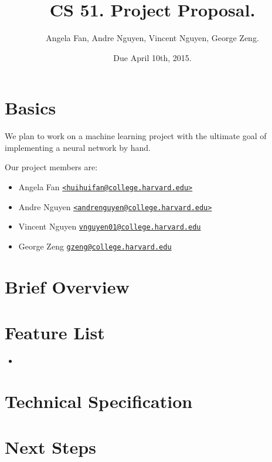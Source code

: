 \documentclass[12pt]{article}
\begin{document}
\title{CS 51. Project Proposal.}
\date{Due April 10th, 2015.}
\author{Angela Fan, Andre Nguyen, Vincent Nguyen, George Zeng.}
\maketitle

\section{Basics}
We plan to work on a machine learning project with the ultimate goal of implementing a neural network by hand.

Our project members are:
\begin{itemize}
  \item Angela Fan \href{mailto:huihuifan@college.harvard.edu}
    {\nolinkurl{<huihuifan@college.harvard.edu>}}
  \item Andre Nguyen \href{mailto:andrenguyen@college.harvard.edu}
    {\nolinkurl{<andrenguyen@college.harvard.edu>}}
  \item Vincent Nguyen \href{mailto:vnguyen01@college.harvard.edu}
    {\nolinkurl{vnguyen01@college.harvard.edu}}
  \item George Zeng \href{mailto:gzeng@college.harvard.edu}
    {\nolinkurl{gzeng@college.harvard.edu}}
\end{itemize}

\section{Brief Overview}

\section{Feature List}
\begin{itemize}
  \item 
\end{itemize}

\section{Technical Specification}

\section{Next Steps}
\end{document}
